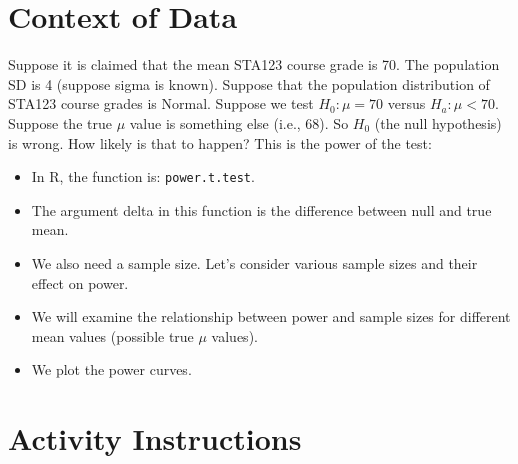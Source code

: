 \documentclass[oneside,openany]{book}
\providecommand{\tightlist}{%
  \setlength{\itemsep}{0pt}\setlength{\parskip}{0pt}}
\begin{document}
\section{Context of Data}\label{context-of-data}

Suppose it is claimed that the mean STA123 course grade is 70. The population SD is 4 (suppose sigma is known). Suppose that the population distribution of STA123 course grades is Normal. Suppose we test \(H_0: \mu = 70\) versus \(H_a: \mu < 70\). Suppose the true \(\mu\) value is something else (i.e., 68). So \(H_0\) (the null hypothesis) is wrong. How likely is that to happen? This is the power of the test:

\begin{itemize}
\tightlist
\item
  In R, the function is: \texttt{power.t.test}.
\item
  The argument delta in this function is the difference between null and true mean.
\item
  We also need a sample size. Let's consider various sample sizes and their effect on power.
\item
  We will examine the relationship between power and sample sizes for different mean values (possible true \(\mu\) values).
\item
  We plot the power curves.
\end{itemize}

\section{Activity Instructions}\label{activity-instructions}
\end{document}
